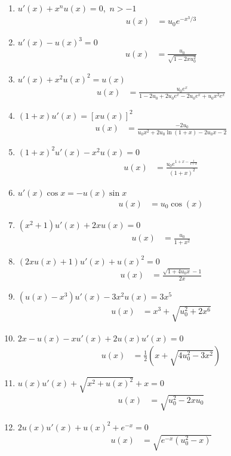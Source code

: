 \documentclass[11pt,answers]{exam}
\begin{document}
\begin{questions}
\begin{solution}
\begin{enumerate}
\item $u'(x)+x^nu(x)=0$,~$n>-1$%
\begin{align*}
u(x)&=u_0e^{-x^3/3}
\end{align*}
\item $u'(x)-u(x)^3=0$%
\begin{align*}
u(x)&=\frac{u_0}{\sqrt{1-2xu_0^2}}
\end{align*}
\item $u'(x)+x^2u(x)^2=u(x)$%
\begin{align*}
u(x)&=\frac{u_0e^x}{1-2u_0+2u_0e^x-2u_0e^x+u_0x^2e^x}
\end{align*}
\item $(1+x)u'(x)=[xu(x)]^2$%
\begin{align*}
u(x)&=\frac{-2u_0}{u_0x^2+2u_0\ln(1+x)-2u_0x-2}
\end{align*}
\item $(1+x)^2u'(x)-x^2u(x)=0$%
\begin{align*}
u(x)&=\frac{u_0e^{1+x-\frac{1}{1+x}}}{(1+x)^2}
\end{align*}
\item $u'(x)\cos x=-u(x)\sin x$%
\begin{align*}
u(x)&=u_0\cos(x)
\end{align*}
\item $\left(x^2+1\right) u'(x)+2 x u(x)=0$%
\begin{align*}
u(x)&=\frac{u_0}{1+x^2}
\end{align*}
\item $(2 x u(x)+1) u'(x)+u(x)^2=0$%
\begin{align*}
u(x)&=\frac{\sqrt{1+4u_0x}-1}{2x}
\end{align*}
\item $(u(x)- x^3)u'(x)-3 x^2 u(x) = 3 x^5 $%
\begin{align*}
u(x)&=x^3+\sqrt{u_0^2+2x^6}
\end{align*}
\item $2 x - u(x) - x u'(x) + 2 u(x)u'(x)=0$%
\begin{align*}
u(x)&=\frac{1}{2}\left(x+\sqrt{4u_0^2-3x^2}\right)
\end{align*}
\item $u(x)u'(x)+\sqrt{x^2+u(x)^2}+x=0$%
\begin{align*}
u(x)&=\sqrt{u_0^2-2xu_0}
\end{align*}
\item $2 u(x) u'(x)+u(x)^2+e^{-x} = 0$%
\begin{align*}
u(x)&=\sqrt{e^{-x}(u_0^2-x)}
\end{align*}
\end{enumerate}
\end{solution}




\end{questions}
\end{document}
